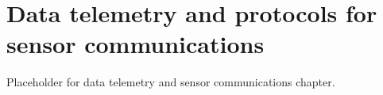 \setchapterpreamble[u]{\margintoc}
\chapter{Data telemetry and protocols for sensor communications}

Placeholder for data telemetry and sensor communications chapter.